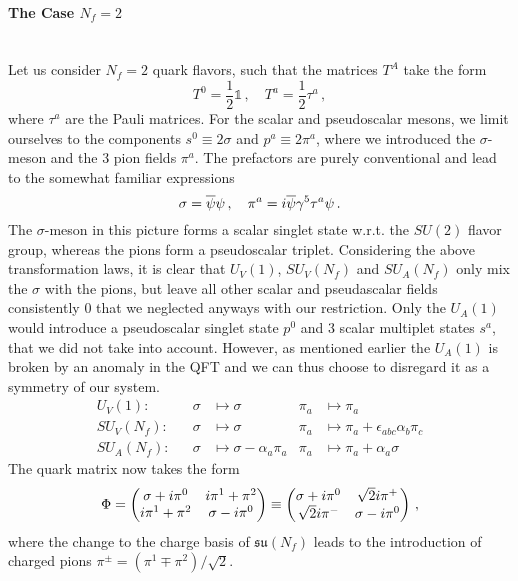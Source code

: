 \paragraph{The Case $N_f=2$}\mbox{}\\

Let us consider $N_f=2$ quark flavors, such that the matrices $T^A$ take the form
\begin{equation}
    T^0=\frac{1}{2}\mathbb{1}\,,\quad T^a=\frac{1}{2}\tau^a\,,
\end{equation}
where $\tau^a$ are the Pauli matrices. For the scalar and pseudoscalar mesons, we limit ourselves to the components $s^0\equiv 2\sigma$ and $p^a\equiv 2\pi^a$, where we introduced the $\sigma$-meson and the 3 pion fields $\pi^a$. The prefactors are purely conventional and lead to the somewhat familiar expressions
\begin{equation}
    \sigma=\overline{\psi}\psi\,,\quad \pi^a={i}\overline{\psi}\gamma^5\tau^a\psi\,.
\end{equation}
The $\sigma$-meson in this picture forms a scalar singlet state w.r.t. the $SU(2)$ flavor group, whereas the pions form a pseudoscalar triplet. Considering the above transformation laws, it is clear that $U_V(1)$, $SU_V(N_f)$ and $SU_A(N_f)$ only mix the $\sigma$ with the pions, but leave all other scalar and pseudascalar fields consistently $0$ that we neglected anyways with our restriction. Only the $U_A(1)$ would introduce a pseudoscalar singlet state $p^0$ and 3 scalar multiplet states $s^a$, that we did not take into account. However, as mentioned earlier the $U_A(1)$ is broken by an anomaly in the QFT and we can thus choose to disregard it as a symmetry of our system.
\begin{subequations}
    \begin{align}
        &  & U_V(1): &  & \sigma & \mapsto\sigma               & \pi_a            & \mapsto\pi_a & & \\
        &  & SU_V(N_f): &  & \sigma & \mapsto\sigma               & \pi_a            & \mapsto\pi_a+\epsilon_{abc}\alpha_b\pi_c                                                    & & \\
        &  & SU_A(N_f): &  & \sigma & \mapsto\sigma-\alpha_a\pi_a & \pi_a            & \mapsto\pi_a+\alpha_a\sigma                                                                 & & 
    \end{align}
\end{subequations}
The quark matrix now takes the form
\begin{equation}
    \Phi=\begin{pmatrix}
        \sigma+{i}\pi^0&{i}\pi^1+\pi^2\\
        {i}\pi^1+\pi^2&\sigma-{i}\pi^0
    \end{pmatrix}\equiv
    \begin{pmatrix}
        \sigma+{i}\pi^0&\sqrt{2}{i}\pi^+\\
        \sqrt{2}{i}\pi^-&\sigma-{i}\pi^0
    \end{pmatrix}\,,
\end{equation}
where the change to the charge basis of $\mathfrak{su}(N_f)$ leads to the introduction of charged pions ${\pi^\pm=(\pi^1\mp\pi^2)/\sqrt{2}}$.

